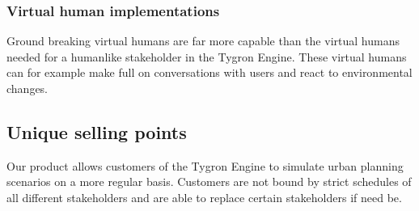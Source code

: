 \subsubsection{Virtual human implementations}
Ground breaking virtual humans\cite{Swart10} are far more capable than the virtual humans needed for a humanlike stakeholder in the Tygron Engine. These virtual humans can for example make full on conversations with users and react to environmental changes.

\subsection{Unique selling points}
Our product allows customers of the Tygron Engine to simulate urban planning scenarios on a more regular basis. Customers are not bound by strict schedules of all different stakeholders and are able to replace certain stakeholders if need be. \newline
